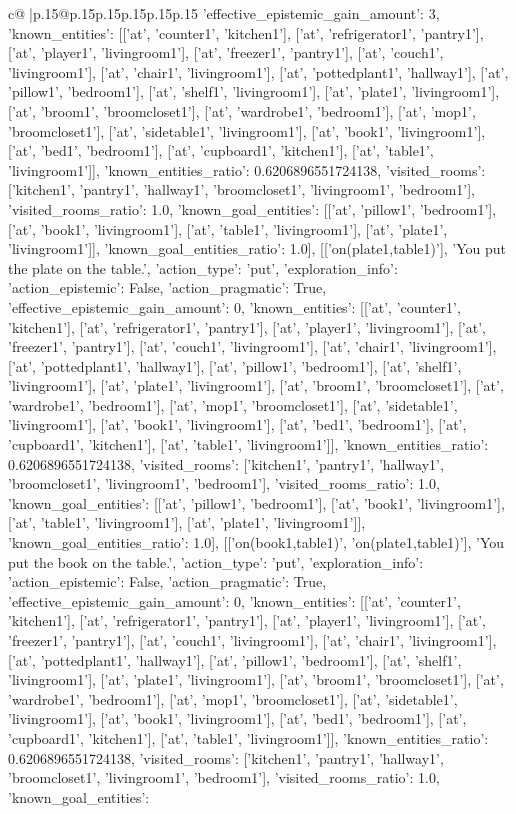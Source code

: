 \documentclass{article}
\begin{document}
{\begin{supertabular}{c@{$\;$}|p{.15\linewidth}@{}p{.15\linewidth}p{.15\linewidth}p{.15\linewidth}p{.15\linewidth}p{.15\linewidth}}
{{{'effective_epistemic_gain_amount': 3, 'known_entities': [['at', 'counter1', 'kitchen1'], ['at', 'refrigerator1', 'pantry1'], ['at', 'player1', 'livingroom1'], ['at', 'freezer1', 'pantry1'], ['at', 'couch1', 'livingroom1'], ['at', 'chair1', 'livingroom1'], ['at', 'pottedplant1', 'hallway1'], ['at', 'pillow1', 'bedroom1'], ['at', 'shelf1', 'livingroom1'], ['at', 'plate1', 'livingroom1'], ['at', 'broom1', 'broomcloset1'], ['at', 'wardrobe1', 'bedroom1'], ['at', 'mop1', 'broomcloset1'], ['at', 'sidetable1', 'livingroom1'], ['at', 'book1', 'livingroom1'], ['at', 'bed1', 'bedroom1'], ['at', 'cupboard1', 'kitchen1'], ['at', 'table1', 'livingroom1']], 'known_entities_ratio': 0.6206896551724138, 'visited_rooms': ['kitchen1', 'pantry1', 'hallway1', 'broomcloset1', 'livingroom1', 'bedroom1'], 'visited_rooms_ratio': 1.0, 'known_goal_entities': [['at', 'pillow1', 'bedroom1'], ['at', 'book1', 'livingroom1'], ['at', 'table1', 'livingroom1'], ['at', 'plate1', 'livingroom1']], 'known_goal_entities_ratio': 1.0}}], [['on(plate1,table1)'], 'You put the plate on the table.', {'action_type': 'put', 'exploration_info': {'action_epistemic': False, 'action_pragmatic': True, 'effective_epistemic_gain_amount': 0, 'known_entities': [['at', 'counter1', 'kitchen1'], ['at', 'refrigerator1', 'pantry1'], ['at', 'player1', 'livingroom1'], ['at', 'freezer1', 'pantry1'], ['at', 'couch1', 'livingroom1'], ['at', 'chair1', 'livingroom1'], ['at', 'pottedplant1', 'hallway1'], ['at', 'pillow1', 'bedroom1'], ['at', 'shelf1', 'livingroom1'], ['at', 'plate1', 'livingroom1'], ['at', 'broom1', 'broomcloset1'], ['at', 'wardrobe1', 'bedroom1'], ['at', 'mop1', 'broomcloset1'], ['at', 'sidetable1', 'livingroom1'], ['at', 'book1', 'livingroom1'], ['at', 'bed1', 'bedroom1'], ['at', 'cupboard1', 'kitchen1'], ['at', 'table1', 'livingroom1']], 'known_entities_ratio': 0.6206896551724138, 'visited_rooms': ['kitchen1', 'pantry1', 'hallway1', 'broomcloset1', 'livingroom1', 'bedroom1'], 'visited_rooms_ratio': 1.0, 'known_goal_entities': [['at', 'pillow1', 'bedroom1'], ['at', 'book1', 'livingroom1'], ['at', 'table1', 'livingroom1'], ['at', 'plate1', 'livingroom1']], 'known_goal_entities_ratio': 1.0}}], [['on(book1,table1)', 'on(plate1,table1)'], 'You put the book on the table.', {'action_type': 'put', 'exploration_info': {'action_epistemic': False, 'action_pragmatic': True, 'effective_epistemic_gain_amount': 0, 'known_entities': [['at', 'counter1', 'kitchen1'], ['at', 'refrigerator1', 'pantry1'], ['at', 'player1', 'livingroom1'], ['at', 'freezer1', 'pantry1'], ['at', 'couch1', 'livingroom1'], ['at', 'chair1', 'livingroom1'], ['at', 'pottedplant1', 'hallway1'], ['at', 'pillow1', 'bedroom1'], ['at', 'shelf1', 'livingroom1'], ['at', 'plate1', 'livingroom1'], ['at', 'broom1', 'broomcloset1'], ['at', 'wardrobe1', 'bedroom1'], ['at', 'mop1', 'broomcloset1'], ['at', 'sidetable1', 'livingroom1'], ['at', 'book1', 'livingroom1'], ['at', 'bed1', 'bedroom1'], ['at', 'cupboard1', 'kitchen1'], ['at', 'table1', 'livingroom1']], 'known_entities_ratio': 0.6206896551724138, 'visited_rooms': ['kitchen1', 'pantry1', 'hallway1', 'broomcloset1', 'livingroom1', 'bedroom1'], 'visited_rooms_ratio': 1.0, 'known_goal_entities': }}}
\end{supertabular}}
\end{document}
